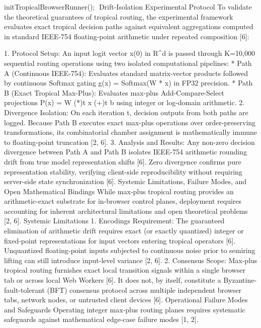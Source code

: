 initTropicalBrowserRunner();
Drift-Isolation Experimental Protocol
To validate the theoretical guarantees of tropical routing, the experimental framework evaluates exact tropical decision paths against equivalent aggregations computed in standard IEEE-754 floating-point arithmetic under repeated composition [6]:


1. Protocol Setup: An input logit vector x(0) in R^d is passed through K=10,000 sequential routing operations using two isolated computational pipelines:
   * Path A (Continuous IEEE-754): Evaluates standard matrix-vector products followed by continuous Softmax gating g(x) = Softmax(W * x) in FP32 precision.
   * Path B (Exact Tropical Max-Plus): Evaluates max-plus Add-Compare-Select projections P(x) = W (*)t x (+)t b using integer or log-domain arithmetic.
2. Divergence Isolation: On each iteration t, decision outputs from both paths are logged. Because Path B executes exact max-plus operations over order-preserving transformations, its combinatorial chamber assignment is mathematically immune to floating-point truncation [2, 6].
3. Analysis and Results: Any non-zero decision divergence between Path A and Path B isolates IEEE-754 arithmetic rounding drift from true model representation shifts [6]. Zero divergence confirms pure representation stability, verifying client-side reproducibility without requiring server-side state synchronization [6].
Systemic Limitations, Failure Modes, and Open Mathematical Bindings
While max-plus tropical routing provides an arithmetic-exact substrate for in-browser control planes, deployment requires accounting for inherent architectural limitations and open theoretical problems [2, 6].
Systemic Limitations
1. Encodings Requirement: The guaranteed elimination of arithmetic drift requires exact (or exactly quantized) integer or fixed-point representations for input vectors entering tropical operators [6]. Unquantized floating-point inputs subjected to continuous noise prior to semiring lifting can still introduce input-level variance [2, 6].
2. Consensus Scope: Max-plus tropical routing furnishes exact local transition signals within a single browser tab or across local Web Workers [6]. It does not, by itself, constitute a Byzantine-fault-tolerant (BFT) consensus protocol across multiple independent browser tabs, network nodes, or untrusted client devices [6].
Operational Failure Modes and Safeguards
Operating integer max-plus routing planes requires systematic safeguards against mathematical edge-case failure modes [1, 2].


